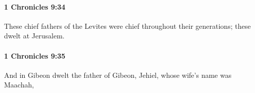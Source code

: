 		\paragraph{1 Chronicles 9:34} %
			\label{1CHRONICLES-9-34}

			These chief fathers of the Levites were chief throughout their generations; these dwelt at Jerusalem.


		\paragraph{1 Chronicles 9:35} %
			\label{1CHRONICLES-9-35}

			And in Gibeon dwelt the father of Gibeon, Jehiel, whose wife’s name was Maachah,


